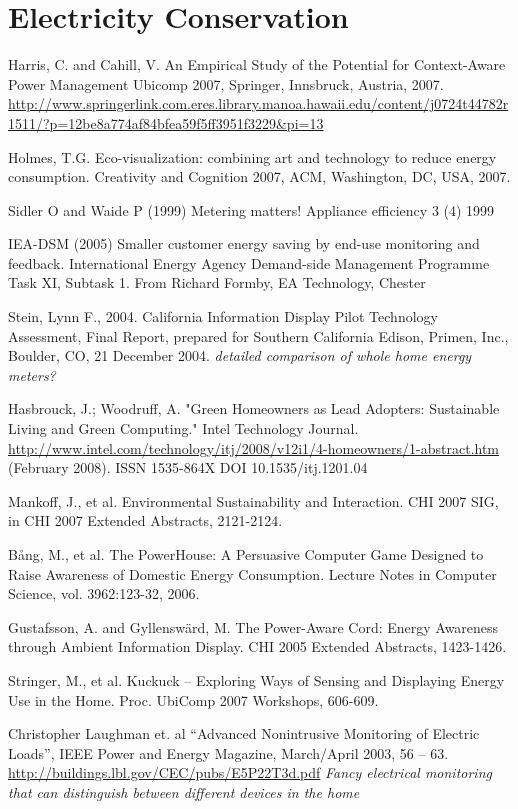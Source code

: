 \section{Electricity Conservation}

Harris, C. and Cahill, V. An Empirical Study of the Potential for Context-Aware Power Management Ubicomp 2007, Springer, Innsbruck, Austria, 2007. \url{http://www.springerlink.com.eres.library.manoa.hawaii.edu/content/j0724t44782r1511/?p=12be8a774af84bfea59f5ff3951f3229&pi=13}

Holmes, T.G. Eco-visualization: combining art and technology to reduce energy consumption. Creativity and Cognition 2007, ACM, Washington, DC, USA, 2007.

Sidler O and Waide P (1999) Metering matters! Appliance efficiency 3 (4) 1999

IEA-DSM (2005) Smaller customer energy saving by end-use monitoring and feedback. International Energy Agency Demand-side Management Programme Task XI, Subtask 1. From Richard Formby, EA Technology, Chester 

Stein, Lynn F., 2004. California Information Display Pilot Technology Assessment, Final Report, prepared for Southern California Edison, Primen, Inc., Boulder, CO, 21 December 2004. \emph{detailed comparison of whole home energy meters?}

Hasbrouck, J.; Woodruff, A. "Green Homeowners as Lead Adopters: Sustainable Living and Green Computing." Intel Technology Journal. \url{http://www.intel.com/technology/itj/2008/v12i1/4-homeowners/1-abstract.htm} (February 2008). ISSN 1535-864X DOI 10.1535/itj.1201.04

Mankoff, J., et al.  Environmental Sustainability and Interaction.  CHI 2007 SIG, in CHI 2007 Extended Abstracts, 2121-2124.

Bång, M., et al. The PowerHouse: A Persuasive Computer Game Designed to Raise Awareness of Domestic Energy Consumption.  Lecture Notes in Computer Science, vol. 3962:123-32, 2006.

Gustafsson, A. and Gyllenswärd, M. The Power-Aware Cord: Energy Awareness through Ambient Information Display. CHI 2005 Extended Abstracts, 1423-1426.

Stringer, M., et al.  Kuckuck – Exploring Ways of Sensing and Displaying Energy Use in the Home.  Proc. UbiComp 2007 Workshops, 606-609.

Christopher Laughman et. al ``Advanced Nonintrusive Monitoring of Electric Loads'', IEEE Power and Energy Magazine, March/April 2003, 56 – 63. \url{http://buildings.lbl.gov/CEC/pubs/E5P22T3d.pdf} \emph{Fancy electrical monitoring that can distinguish between different devices in the home}


